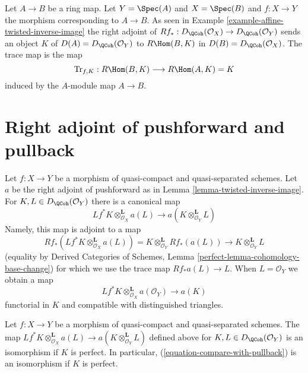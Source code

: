 \begin{example}
\label{example-trace-affine}
Let $A \to B$ be a ring map. Let $Y = \Spec(A)$ and $X = \Spec(B)$
and $f : X \to Y$ the morphism corresponding to $A \to B$. As seen
in Example \ref{example-affine-twisted-inverse-image}
the right adjoint of
$Rf_* : D_\QCoh(\mathcal{O}_X) \to D_\QCoh(\mathcal{O}_Y)$
sends an object $K$ of $D(A) = D_\QCoh(\mathcal{O}_Y)$ to $R\Hom(B, K)$ in
$D(B) = D_\QCoh(\mathcal{O}_X)$. The trace map is the map
$$
\text{Tr}_{f, K} : R\Hom(B, K) \longrightarrow R\Hom(A, K) = K
$$
induced by the $A$-module map $A \to B$.
\end{example}




\section{Right adjoint of pushforward and pullback}
\label{section-compare-with-pullback}

\noindent
Let $f : X \to Y$ be a morphism of quasi-compact and quasi-separated
schemes. Let $a$ be the right adjoint of pushforward as in
Lemma \ref{lemma-twisted-inverse-image}. For $K, L \in D_\QCoh(\mathcal{O}_Y)$
there is a canonical map
$$
Lf^*K \otimes^\mathbf{L}_{\mathcal{O}_X} a(L)
\longrightarrow
a(K \otimes_{\mathcal{O}_Y}^\mathbf{L} L)
$$
Namely, this map is adjoint to a map
$$
Rf_*(Lf^*K \otimes^\mathbf{L}_{\mathcal{O}_X} a(L)) =
K \otimes^\mathbf{L}_{\mathcal{O}_Y} Rf_*(a(L))
\longrightarrow
K \otimes^\mathbf{L}_{\mathcal{O}_Y} L
$$
(equality by Derived Categories of Schemes, Lemma
\ref{perfect-lemma-cohomology-base-change})
for which we use the trace map $Rf_*a(L) \to L$.
When $L = \mathcal{O}_Y$ we obtain a map
\begin{equation}
\label{equation-compare-with-pullback}
Lf^*K \otimes^\mathbf{L}_{\mathcal{O}_X} a(\mathcal{O}_Y) \longrightarrow a(K)
\end{equation}
functorial in $K$ and compatible with distinguished triangles.

\begin{lemma}
\label{lemma-compare-with-pullback-perfect}
Let $f : X \to Y$ be a morphism of quasi-compact and quasi-separated
schemes. The map
$Lf^*K \otimes^\mathbf{L}_{\mathcal{O}_X} a(L) \to
a(K \otimes_{\mathcal{O}_Y}^\mathbf{L} L)$
defined above for $K, L \in D_\QCoh(\mathcal{O}_Y)$
is an isomorphism if $K$ is perfect. In particular,
(\ref{equation-compare-with-pullback}) is an isomorphism if $K$ is perfect.
\end{lemma}

